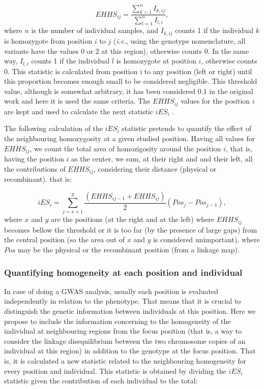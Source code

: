\documentclass[a4paper,11pt]{article}
\begin{document}
 \begin{equation}
 EHHS_{ij} = \frac{\sum_{k=1}^{n}I_{k,ij}}{\sum_{l=1}^{n}I_{l,i}},
 \end{equation}
where $n$ is the number of individual samples, and $I_{k,ij}$ counts 1 if the individual $k$ is homozygote from position $i$ to $j$ (\textit{i.e.}, using the genotype nomenclature, all variants have the values 0 or 2 at this region), otherwise counts 0. In the same way, $I_{l,i}$ counts 1 if the individual $l$ is homozygote at position $i$, otherwise counts 0. This statistic is calculated from position i to any position (left or right) until this proportion becomes enough small to be considered negligible. This threshold value, although is somewhat arbitrary, it has been considered 0.1 in the original work \citep{Tang:2007by} and here it is used the same criteria. The $EHHS_{ij}$ values for the position $i$ are kept and used to calculate the next statistic $iES_i$ \citep{Tang:2007by}.

The following calculation of the $iES_i$ statistic pretends to quantify the effect of the neighbouring homozygosity at a given studied position. Having all values for $EHHS_{ij}$, we count the total area of homozigosity around the position $i$, that is, having the position $i$ as the center, we sum, at their right and and their left, all the contributions of $EHHS_{ij}$, considering their distance (physical or recombinant). that is: 

 \begin{equation}
 iES_i = \sum_{j=x+1}^{y}\frac{(EHHS_{ij-1} + EHHS_{ij})}{2} (Pos_{j} - Pos_{j-1}),
 \end{equation}
where $x$ and $y$ are the positions (at the right and at the left) where $EHHS_{ij}$ becomes bellow the threshold or it is too far (by the presence of large gaps) from the central position (so the area out of $x$ and $y$ is considered unimportant), where $Pos$ may be the physical or the recombinant position (from a linkage map).
 
\subsubsection{Quantifying homogeneity at each position and individual}
In case of doing a GWAS analysis, usually each position is evaluated independently in relation to the phenotype. That means that it is crucial to distinguish the genetic information between individuals at this position. Here we propose to include the information concerning to the homogeneity of the individual at neighbouring regions from the focus position (that is, a way to consider the linkage disequilibrium between the two chromosome copies of an individual at this region) in addition to the genotype at the focus position. That is, it is calculated a new statistic related to the neighbouring homogeneity for every position and individual. This statistic is obtained by dividing the $iES_i$ statistic given the contribution of each individual to the total:
\end{document}
